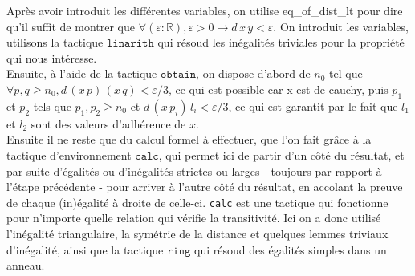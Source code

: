 Après avoir introduit les différentes variables, on utilise eq\_of\_dist\_lt pour dire qu'il suffit de montrer que $\forall (\varepsilon : \mathbb{R}), \varepsilon > 0 \to d \,x\,y < \varepsilon$. On introduit les variables, utilisons la tactique $\texttt{linarith}$ qui résoud les inégalités triviales pour la propriété qui nous intéresse. \\
Ensuite, à l'aide de la tactique $\texttt{obtain}$, on dispose d'abord de $n_0$ tel que $\forall p,q \geq n_0, d\, (x\, p)\, (x\, q) < \varepsilon /3$, ce qui est possible car x est de cauchy, puis $p_1$ et $p_2$ tels que $p_1 , p_2 \geq n_0$ et $d\,(x\,p_i)\,l_i < \varepsilon /3$, ce qui est garantit par le fait que $l_1$ et $l_2$ sont des valeurs d'adhérence de $x$.\\
Ensuite il ne reste que du calcul formel à effectuer, que l'on fait grâce à la tactique d'environnement $\texttt{calc}$, qui permet ici de partir d'un côté du résultat, et par suite d'égalités ou d'inégalités strictes ou larges - toujours par rapport à l'étape précédente - pour arriver à l'autre côté du résultat, en accolant la preuve de chaque (in)égalité à droite de celle-ci. \texttt{calc} est une tactique qui fonctionne pour n'importe quelle relation qui vérifie la transitivité. Ici on a donc utilisé l'inégalité triangulaire, la symétrie de la distance et quelques lemmes triviaux d'inégalité, ainsi que la tactique $\texttt{ring}$ qui résoud des égalités simples dans un anneau.\\